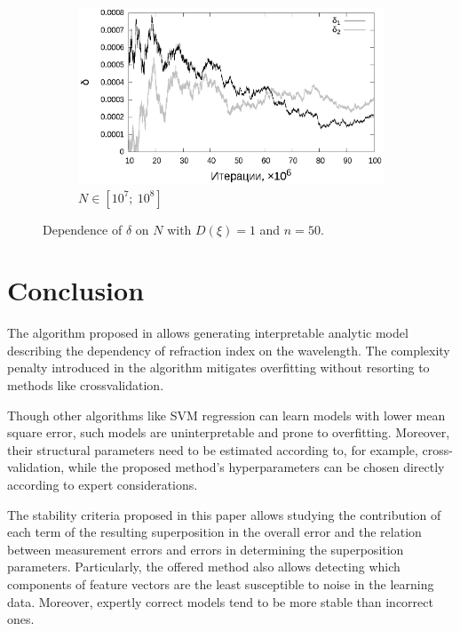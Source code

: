 \documentclass[11pt,a4paper]{article}
\theoremstyle{definition}
\begin{document}
\begin{figure}[h!]
\begin{subfigure}[b]{0.3\textwidth}
    \includegraphics[width=\textwidth]{figs/classic/linear_log_1x_2_samples_50_variance_1_norm.log_end.eps}
    \caption{$N \in [10^7;~10^8]$}
    \label{fig:classic_var1_n50_end}
  \end{subfigure}
  \caption{Dependence of $\delta$ on $N$ with $D(\xi) = 1$ and $n = 50$.}
  \label{fig:classic_var1_n50}
\end{figure}

\section{Conclusion}

The algorithm proposed in \citep{Rudoy13} allows generating interpretable analytic
model describing the dependency of refraction index on the wavelength. The complexity
penalty introduced in the algorithm mitigates overfitting without resorting to methods
like crossvalidation.

Though other algorithms like SVM regression can learn models with lower mean square error,
such models are uninterpretable and prone to overfitting. Moreover, their
structural parameters need to be estimated according to, for example,
cross-validation, while the proposed method's hyperparameters can be chosen directly
according to expert considerations.

The stability criteria proposed in this paper allows studying the contribution of each
term of the resulting superposition in the overall error
and the relation between measurement errors
and errors in determining the superposition parameters. Particularly, the offered method
also allows detecting which components of feature vectors are the least susceptible to
noise in the learning data. Moreover, expertly correct models tend to be more stable
than incorrect ones.

\FloatBarrier

%
%
%

\end{document}
